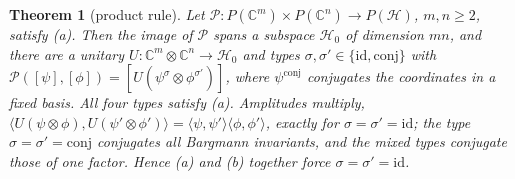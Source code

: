 \documentclass[aps,pra,onecolumn,superscriptaddress,nofootinbib,10pt]{revtex4-2}
\newtheorem{theorem}{Theorem}
\theoremstyle{definition}
\theoremstyle{remark}
\newcommand{\C}{\mathbb{C}}
\newcommand{\ip}[2]{\langle #1,#2\rangle}
\begin{document}
\begin{theorem}[product rule]\label{thm:product}
Let $\mathcal P\colon P(\C^m)\times P(\C^n)\to P(\mathcal H)$, $m,n\ge2$, satisfy (a).  Then the image of $\mathcal P$ spans a
subspace $\mathcal H_0$ of dimension $mn$, and there are a unitary $U\colon\C^m\otimes\C^n\to\mathcal H_0$
and types $\sigma,\sigma'\in\{\mathrm{id},\mathrm{conj}\}$ with
$\mathcal P([\psi],[\phi])=[U(\psi^\sigma\otimes\phi^{\sigma'})]$, where $\psi^{\mathrm{conj}}$ conjugates the coordinates in a fixed
basis.  All four types satisfy (a).  Amplitudes multiply, $\ip{U(\psi\otimes\phi)}{U(\psi'\otimes\phi')}=
\ip{\psi}{\psi'}\ip{\phi}{\phi'}$, exactly for $\sigma=\sigma'=\mathrm{id}$; the type $\sigma=\sigma'=\mathrm{conj}$ conjugates all
Bargmann invariants, and the mixed types conjugate those of one factor.  Hence (a) and (b) together
force $\sigma=\sigma'=\mathrm{id}$.
\end{theorem}
\end{document}
